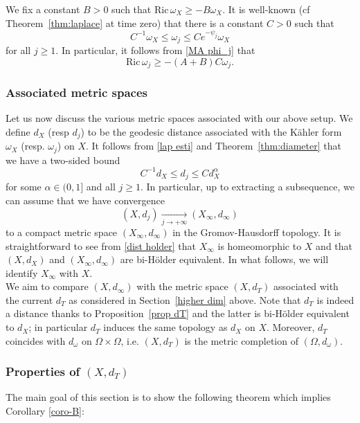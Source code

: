 \documentclass[a4paper,11pt,leqno,english]{smfart}
\theoremstyle{plain}
\theoremstyle{plain}
\numberwithin{equation}{section} %
\numberwithin{figure}{section} %
\theoremstyle{plain}
\theoremstyle{plain}
\theoremstyle{remark}
\theoremstyle{remark}
\theoremstyle{definition}
\theoremstyle{plain}
\theoremstyle{plain}
\theoremstyle{definition}
\newcommand{\Ric}{\mathrm{Ric} \,}
\renewcommand{\ge}{\geq}
\renewcommand{\le}{\leq}
\begin{document}
We fix a constant $B>0$ such that $\Ric \omega_X \ge -B\omega_X$. It is well-known (cf Theorem~\ref{thm:laplace} at time zero) that there is a constant $C>0$ such that 
\begin{equation}
\label{lap esti}
C^{-1}\omega_X \le \omega_j \le Ce^{-\psi_j} \omega_X
\end{equation}
for all $j\ge 1$. In particular, it follows from \eqref{MA phi_j} that 
\begin{equation}
\label{ricci lb}
\Ric \omega_j \ge -(A+B)C\omega_j. 
\end{equation}

\subsubsection{Associated metric spaces}
Let us now discuss the various metric spaces associated with our above setup. We define $d_X$ (resp $d_j$) to be the geodesic distance associated with the Kähler form $\omega_X$ (resp. $\omega_j$) on $X$. It follows from \eqref{lap esti} and Theorem~\ref{thm:diameter} that we have a two-sided bound
\begin{equation}
\label{dist holder}
C^{-1}d_X \le d_j \le C d_X^{\alpha}
\end{equation}
for some $\alpha \in (0,1]$ and all $j\ge 1$. In particular, up to extracting a subsequence, we can assume that we have convergence 
\[(X,d_j)\underset{j\to +\infty}\longrightarrow (X_\infty, d_\infty)\]
 to a compact metric space $(X_\infty, d_\infty)$ in the Gromov-Hausdorff topology. It is straightforward to see from \eqref{dist holder} that $X_\infty$ is homeomorphic to $X$ and that $(X,d_X)$ and $(X_\infty, d_\infty)$ are bi-Hölder equivalent. In what follows, we will identify $X_\infty$ with $X$. \\

We aim to compare $(X, d_\infty)$ with the metric space $(X,d_T)$ associated with the current $d_T$ as considered in  Section~\ref{higher dim} above. Note that $d_T$ is indeed a distance thanks to Proposition~\ref{prop dT} and the latter is bi-Hölder equivalent to $d_X$; in particular $d_T$ induces the same topology as $d_X$ on $X$. Moreover, $d_T$ coincides with $d_\omega$ on $\Omega\times \Omega$, i.e. $(X,d_T)$ is the metric completion of $(\Omega, d_\omega)$. 


 

\subsubsection{Properties of $(X,d_T)$}
The main goal of this section is to show the following theorem which implies Corollary \ref{coro-B}:
\end{document}
